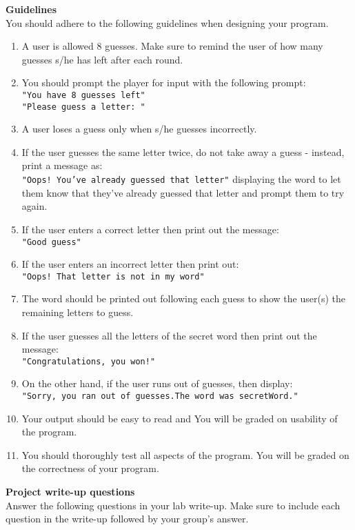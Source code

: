 \documentclass[12pt]{article}
\begin{document}
\vspace*{0.5cm}
\noindent\textbf{Guidelines}\\
You should adhere to the following guidelines when designing your program.
\begin{enumerate}
	\item A user is allowed 8 guesses. Make sure to remind the user of how many guesses s/he has left after each round. 
	\item You should prompt the player for input with the following prompt:\\
	\texttt{"You have 8 guesses left"}\\
	\texttt{"Please guess a letter: "}
	\item A user loses a guess only when s/he guesses incorrectly.
	\item If the user guesses the same letter twice, do not take away a guess - instead, print a message as:\\
	\texttt{"Oops! You've already guessed that letter"}
	displaying the word to let them know that they've already guessed that letter and prompt them to try again.\\
	\item If the user enters a correct letter then print out the message:\\
	\texttt{"Good guess"}
	\item If the user enters an incorrect letter then print out:\\
	\texttt{"Oops! That letter is not in my word"}
	\item The word should be printed out following each guess to show the user(s) the remaining letters to guess.
	\item If the user guesses all the letters of the secret word then print out the message:\\ 
	\texttt{"Congratulations, you won!"}
	\item On the other hand, if the user runs out of guesses, then display:\\ 
	\texttt{"Sorry, you ran out of guesses.The word was secretWord."}
	\item Your output should be easy to read and You will be graded on usability of the program.
	\item You should thoroughly test all aspects of the program. You will be graded on the correctness of your program.
\end{enumerate}
\vspace*{0.5cm}
\noindent\textbf{Project write-up questions}\\
Answer the following questions in your lab write-up. Make sure to include each question in the write-up followed by your group's answer.
\end{document}
